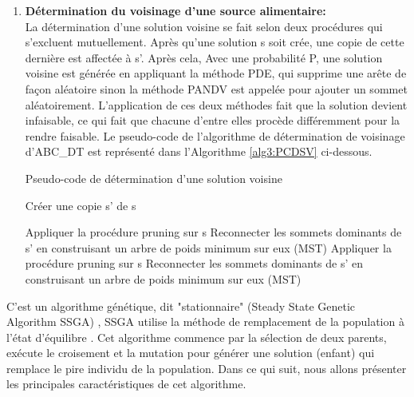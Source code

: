 \begin{enumerate}[label=\alph*)]
\begin{algorithm}[H]
{{		
	}
		
}

\end{algorithm}


	\item \textbf{Détermination du voisinage d’une source alimentaire:}\\
	La détermination d’une solution voisine se fait selon deux procédures qui s’excluent mutuellement. Après qu’une solution s soit crée, une copie de cette dernière est affectée à s’. Après cela, Avec une probabilité P, une solution voisine est générée en appliquant la méthode PDE, qui  supprime une arête de façon aléatoire sinon la méthode PANDV est appelée pour ajouter un sommet aléatoirement. L’application de ces deux méthodes fait que la solution devient infaisable, ce qui fait que chacune d’entre elles procède différemment pour la rendre faisable. Le pseudo-code de l’algorithme de détermination de voisinage d’ABC\_DT est représenté dans l’Algorithme \ref{alg3:PCDSV} ci-dessous.\\


\begin{algorithm}[H]
\label{alg3:PCDSV}
\caption{ Pseudo-code de détermination d'une solution voisine}
\SetAlgoLined
\DontPrintSemicolon
\large


Créer une copie s' de s \;


Appliquer la procédure pruning sur s \;
Reconnecter les sommets dominants de s’ en construisant un arbre de poids minimum sur eux (MST) \;
Appliquer la procédure pruning sur s \;
Reconnecter les sommets dominants de s’ en construisant un arbre de poids minimum sur
eux (MST) \;

\end{algorithm}

\end{enumerate}


C’est un algorithme génétique, dit "stationnaire" (Steady State Genetic Algorithm SSGA) \cite{sundar2014steady}, SSGA utilise la méthode de remplacement de la population à l'état d'équilibre \cite{davis1991handbook}. Cet algorithme commence par la sélection de deux parents, exécute le croisement et la mutation pour générer une solution (enfant) qui remplace le pire individu de la population. Dans ce qui suit, nous allons présenter les principales caractéristiques de cet algorithme.

